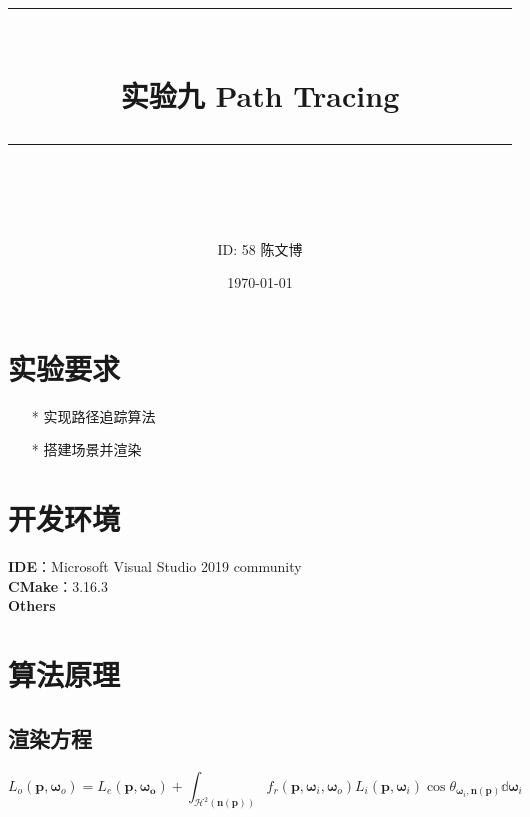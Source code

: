 \documentclass[14pt]{scrartcl} %
\title{	
	\normalfont\normalsize
	\rule{\linewidth}{0.5pt}\\ %
	\vspace{20pt} %
	{\huge 实验九	Path Tracing}\\ %
	\vspace{12pt} %
	\rule{\linewidth}{2pt}\\ %
	\vspace{12pt} %
}
\author{\LARGE ID: 58		陈文博} %
\date{\normalsize\today} %
\begin{document}
\maketitle %


\section{实验要求}


\begin{itemize}
	\item[*] 实现路径追踪算法
	\item[*] 搭建场景并渲染
\end{itemize}


\section{开发环境}

\textbf{IDE}：Microsoft Visual Studio 2019 community\\
\textbf{CMake}：3.16.3\\
\textbf{Others}

\pagebreak
\section{算法原理}

\subsection{渲染方程}
\begin{equation}
L_o(\pmb{p},\pmb{\omega}_o)=L_e(\pmb{p},\pmb{\pmb{\omega}_o})+\int_{\mathcal{H}^2(\pmb{n}(\pmb{p}))} f_r(\pmb{p},\pmb{\omega}_i,\pmb{\omega}_o)L_i(\pmb{p},\pmb{\omega}_i)\cos\theta_{\pmb{\omega}_i,\pmb{n}(\pmb{p})}\mathbb{d}\pmb{\omega}_i
\end{equation}
\end{document}
